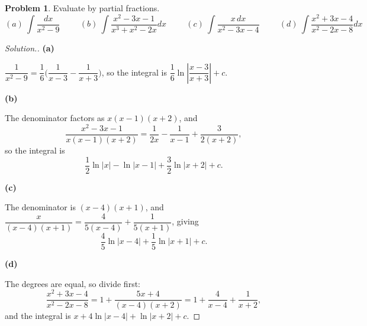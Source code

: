 \documentclass[11pt,a4paper]{article}
\theoremstyle{definition}
\newtheorem{problemx}{Problem}[subsection]
\newenvironment{problem}{\begin{problemx}}{\end{problemx}}
\newenvironment{solution}
  {\renewcommand{\qedsymbol}{}\begin{proof}[\textit{Solution}.]}
  {\end{proof}}
\newcommand{\subhead}[1]{%
  \par\medskip\noindent\textbf{#1}\par\nobreak\smallskip}
\begin{document}
\begin{problem}
Evaluate by partial fractions.
$$(a)\ \int\frac{dx}{x^2-9}\hspace{1cm}
(b)\ \int\frac{x^2-3x-1}{x^3+x^2-2x}dx\hspace{1cm}
(c)\ \int\frac{x\,dx}{x^2-3x-4}\hspace{1cm}
(d)\ \int\frac{x^2+3x-4}{x^2-2x-8}dx$$
\end{problem}
\begin{solution}
\subhead{(a)}
$\dfrac{1}{x^2-9} = \dfrac{1}{6}\Big(\dfrac{1}{x-3} - \dfrac{1}{x+3}\Big)$, so
the integral is
$\dfrac16\ln\left|\dfrac{x-3}{x+3}\right| + c$.

\subhead{(b)}
The denominator factors as $x(x-1)(x+2)$, and
$$\frac{x^2-3x-1}{x(x-1)(x+2)}
= \frac{1}{2x} - \frac{1}{x-1} + \frac{3}{2(x+2)},$$
so the integral is
$$\frac12\ln\left|x\right| - \ln\left|x-1\right|
+ \frac32\ln\left|x+2\right| + c .$$

\subhead{(c)}
The denominator is $(x-4)(x+1)$, and
$\dfrac{x}{(x-4)(x+1)} = \dfrac{4}{5(x-4)} + \dfrac{1}{5(x+1)}$, giving
$$\frac45\ln\left|x-4\right| + \frac15\ln\left|x+1\right| + c .$$

\subhead{(d)}
The degrees are equal, so divide first:
$$\frac{x^2+3x-4}{x^2-2x-8} = 1 + \frac{5x+4}{(x-4)(x+2)}
= 1 + \frac{4}{x-4} + \frac{1}{x+2},$$
and the integral is
$x + 4\ln\left|x-4\right| + \ln\left|x+2\right| + c$.
\end{solution}
\end{document}
